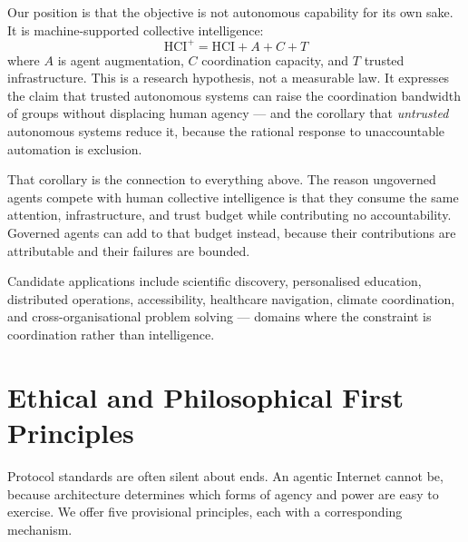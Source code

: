 \documentclass[11pt]{article}
\begin{document}
Our position is that the objective is not autonomous capability for its own sake.
It is machine-supported collective intelligence:
\[
\mathrm{HCI}^{+} = \mathrm{HCI} + A + C + T
\]
where $A$ is agent augmentation, $C$ coordination capacity, and $T$ trusted
infrastructure. This is a research hypothesis, not a measurable law. It expresses
the claim that trusted autonomous systems can raise the coordination bandwidth of
groups without displacing human agency --- and the corollary that \emph{untrusted}
autonomous systems reduce it, because the rational response to unaccountable
automation is exclusion.

That corollary is the connection to everything above. The reason ungoverned
agents compete with human collective intelligence is that they consume the same
attention, infrastructure, and trust budget while contributing no accountability.
Governed agents can add to that budget instead, because their contributions are
attributable and their failures are bounded.

Candidate applications include scientific discovery, personalised education,
distributed operations, accessibility, healthcare navigation, climate
coordination, and cross-organisational problem solving --- domains where the
constraint is coordination rather than intelligence.

\section{Ethical and Philosophical First Principles}

Protocol standards are often silent about ends. An agentic Internet cannot be,
because architecture determines which forms of agency and power are easy to
exercise. We offer five provisional principles, each with a corresponding
mechanism.
\end{document}
